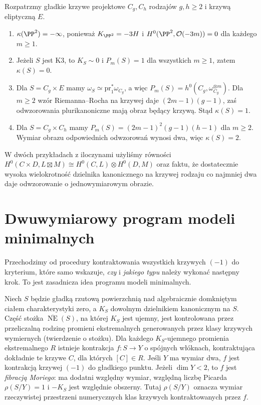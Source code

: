 \begin{przyklad}
\label{prz:ga8-kodaira-four}
Rozpatrzmy gładkie krzywe projektowe $C_g,C_h$
rodzajów $g,h\ge2$ i krzywą eliptyczną $E$.
\begin{enumerate}[label=(\roman*)]
\item $\kappa(\PP^2)=-\infty$, ponieważ
$K_{\PP^2}=-3H$ i $H^0(\PP^2,\mathcal O(-3m))=0$
dla każdego $m\ge1$.
\item Jeżeli $S$ jest K3, to $K_S\sim0$ i
$P_m(S)=1$ dla wszystkich $m\ge1$, zatem $\kappa(S)=0$.
\item Dla $S=C_g\times E$ mamy
$\omega_S\simeq\mathrm{pr}_1^*\omega_{C_g}$,
a więc $P_m(S)=h^0(C_g,\omega_{C_g}^{\otimes m})$.
Dla $m\ge2$ wzór Riemanna--Rocha na krzywej
daje $(2m-1)(g-1)$, zaś odwzorowania
plurikanoniczne mają obraz będący krzywą.
Stąd $\kappa(S)=1$.
\item Dla $S=C_g\times C_h$ mamy
$P_m(S)=(2m-1)^2(g-1)(h-1)$ dla $m\ge2$.
Wymiar obrazu odpowiednich odwzorowań wynosi dwa,
więc $\kappa(S)=2$.
\end{enumerate}
W dwóch przykładach z iloczynami użyliśmy równości
$H^0(C\times D,L\boxtimes M)
\cong H^0(C,L)\otimes H^0(D,M)$ oraz faktu,
że dostatecznie wysoka wielokrotność dzielnika
kanonicznego na krzywej rodzaju co najmniej dwa
daje odwzorowanie o jednowymiarowym obrazie.
\end{przyklad}

\section{Dwuwymiarowy program modeli minimalnych}
\label{sec:ga8-surface-mmp}

Przechodzimy od procedury kontraktowania wszystkich
krzywych $(-1)$ do kryterium, które samo wskazuje,
\emph{czy} i \emph{jakiego typu} należy wykonać następny krok.
To jest zasadnicza idea programu modeli minimalnych.

\begin{twierdzenie}
\label{tw:ga8-surface-contraction}
Niech $S$ będzie gładką rzutową powierzchnią nad
algebraicznie domkniętym ciałem charakterystyki zero,
a $K_S$ dowolnym dzielnikiem kanonicznym na $S$.
Część stożka $\overline{\operatorname{NE}}(S)$, na której
$K_S$ jest ujemny, jest kontrolowana przez przeliczalną
rodzinę promieni ekstremalnych generowanych przez klasy
krzywych wymiernych (twierdzenie o stożku).
Dla każdego $K_S$-ujemnego promienia ekstremalnego $R$
istnieje kontrakcja $f:S\to Y$ o spójnych włóknach,
kontraktująca dokładnie te krzywe $C$, dla których
$[C]\in R$. Jeśli $Y$ ma wymiar dwa, $f$ jest
kontrakcją krzywej $(-1)$ do gładkiego punktu.
Jeżeli $\dim Y<2$, to $f$ jest \emph{fibracją Moriego}:
ma dodatni względny wymiar, względną liczbę Picarda
$\rho(S/Y)=1$ i $-K_S$ jest względnie obszerny.
Tutaj $\rho(S/Y)$ oznacza wymiar rzeczywistej przestrzeni
numerycznych klas krzywych kontraktowanych przez $f$.
\end{twierdzenie}

